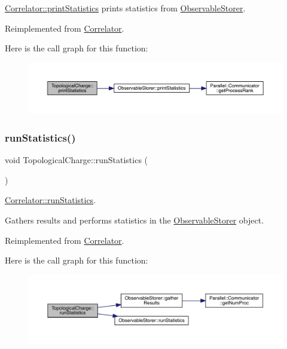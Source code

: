 \mbox{\hyperlink{class_correlator_a2168d677f547769784781d2e2aaa53cf}{Correlator\+::print\+Statistics}} prints statistics from \mbox{\hyperlink{class_observable_storer}{Observable\+Storer}}. 



Reimplemented from \mbox{\hyperlink{class_correlator_a2168d677f547769784781d2e2aaa53cf}{Correlator}}.

Here is the call graph for this function\+:
\nopagebreak
\begin{figure}[H]
\begin{center}
\leavevmode
\includegraphics[width=350pt]{class_topological_charge_ad56263921d283d315b04ab40c9594a2c_cgraph}
\end{center}
\end{figure}
\mbox{\label{class_topological_charge_ab9afadb9f37e638c0a168ebab5d41353}} 
\subsubsection{\texorpdfstring{runStatistics()}{runStatistics()}}
{\footnotesize\ttfamily void Topological\+Charge\+::run\+Statistics (\begin{DoxyParamCaption}{ }\end{DoxyParamCaption})\hspace{0.3cm}{\ttfamily [virtual]}}



\mbox{\hyperlink{class_correlator_a35197b1d12b62ef30b79c0138a26456e}{Correlator\+::run\+Statistics}}. 

Gathers results and performs statistics in the \mbox{\hyperlink{class_observable_storer}{Observable\+Storer}} object. 

Reimplemented from \mbox{\hyperlink{class_correlator_a35197b1d12b62ef30b79c0138a26456e}{Correlator}}.

Here is the call graph for this function\+:
\nopagebreak
\begin{figure}[H]
\begin{center}
\leavevmode
\includegraphics[width=350pt]{class_topological_charge_ab9afadb9f37e638c0a168ebab5d41353_cgraph}
\end{center}
\end{figure}


